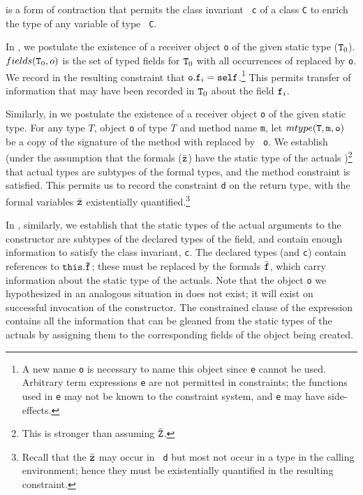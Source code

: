 \TInv{} is a form of contraction that permits the class invariant {\tt
c} of a class {\tt C} to enrich the type of any variable of type {\tt
C}.

In \TField, we postulate the existence of a receiver object {\tt o} of
the given static type (${\tt T}_0$). $fields({\tt T}_0,o)$ is
the set of typed fields for ${\tt T}_0$ with all occurrences of 
\this{} replaced  by {\tt o}. We record in the resulting
constraint that ${\tt o.f}_i=\self$.\footnote{A new name {\tt o} is
necessary to name this object since {\tt e} cannot be used. Arbitrary
term expressions {\tt e} are not permitted in constraints; the
functions used in {\tt e} may not be known to the constraint system,
and {\tt e} may have side-effects.}  This permits transfer of
information that may have been recorded in ${\tt T}_0$ about the field
${\tt f}_i$. 

Similarly, in \TInvk{} we postulate the existence of a receiver object
{\tt o} of the given static type. For any type $T$, object {\tt o} of
type $T$ and method name {\tt m}, let $mtype({\tt T},{\tt m},{\tt o})$
be a copy of the signature of the method with \this{} replaced by {\tt
o}. We establish (under the assumption that the formals ($\bar{\tt
z}$) have the static type of the actuals
)\footnote{This is stronger than assuming $\bar{\tt Z}$.}
that actual types are
subtypes of the formal types, and the method constraint is
satisfied. This permits us to record the constraint {\tt d} on the
return type, with the formal variables $\bar{\tt z}$ existentially
quantified.\footnote{Recall that the $\bar{\tt z}$ may occur in {\tt
d} but most not occur in a type in the calling environment; hence they
must be existentially quantified in the resulting constraint.}

In \TNew, similarly, we establish that the static types of the actual
arguments to the constructor are subtypes of the declared types of the
field, and contain enough information to satisfy the class invariant,
{\tt c}. The declared types (and {\tt c}) contain references to ${\tt
this.\bar{\tt f}}$; these must be replaced by the formals $\bar{\tt
f}$, which carry information about the static type of the
actuals. Note that the object {\tt o} we hypothesized in an analogous
situation in \TInvk{} does not exist; it will exist on successful
invocation of the constructor. The constrained clause of the \new{}
expression contains all the information that can be gleaned from the
static types of the actuals by assigning them to the corresponding
fields of the object being created.


